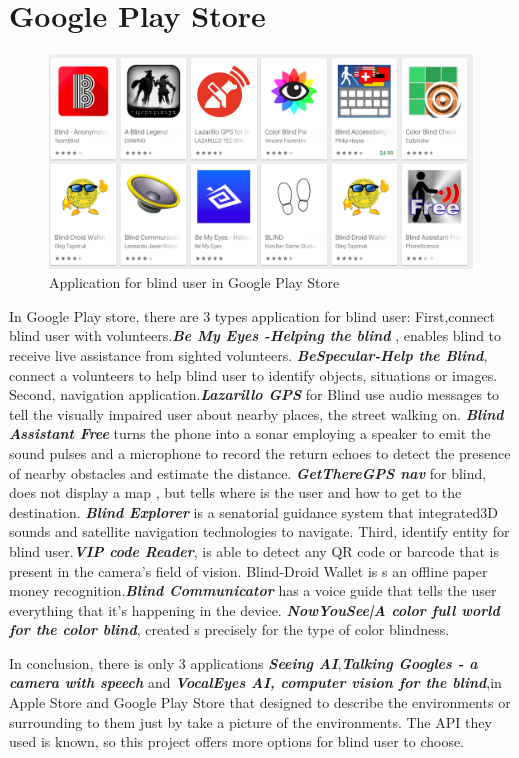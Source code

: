 \documentclass[11pt]{ucscthesis}
\begin{document}
\section{Google Play Store}
\begin{figure}
    \centering
    \includegraphics[width =0.8\linewidth]{Fig/GooglePlayStore.png}
    \caption{Application for blind user in Google Play Store}
    \label{Application for blind user in Google Play Store}
\end{figure}
In Google Play store, there are 3 types application for blind user: First,connect blind user with volunteers.\textbf{\textit{Be My Eyes -Helping the blind}} , enables blind to receive live assistance from sighted volunteers. \textbf{\textit{BeSpecular-Help the Blind}}, connect a volunteers to help blind user to identify objects, situations or images. Second, navigation application.\textbf{\textit{Lazarillo GPS}} for Blind use audio messages to tell the visually impaired user about nearby places, the street walking on. \textbf{\textit{Blind Assistant Free}}  turns the phone into a sonar employing a speaker to emit the sound pulses and a microphone to record the return echoes to detect the presence of nearby obstacles and estimate the distance. \textbf{\textit{GetThereGPS nav}} for blind, does not display a map , but tells where is the user and how to get to the destination. \textbf{\textit{Blind Explorer}} is a senatorial guidance system that integrated3D sounds and satellite navigation  technologies to navigate. Third, identify entity for blind user.\textbf{\textit{VIP code Reader}}, is able to detect any QR code or barcode that is present in the camera's field of vision. Blind-Droid Wallet is s an offline paper money recognition.\textbf{\textit{Blind Communicator}} has a voice guide that tells the user everything that it's happening in the device. \textbf{\textit{NowYouSee|A color full world for the color blind}}, created s precisely for the type of color blindness.


In conclusion, there is only 3 applications  \textbf{\textit{Seeing AI}},\textbf{\textit{Talking Googles - a camera with speech}} and \textbf{\textit{VocalEyes AI, computer vision for the blind}},in Apple Store and Google Play Store that designed to describe the environments or surrounding to them just by take a picture of the environments. The API they used is known, so this project offers more options for blind user to choose.
\end{document}
